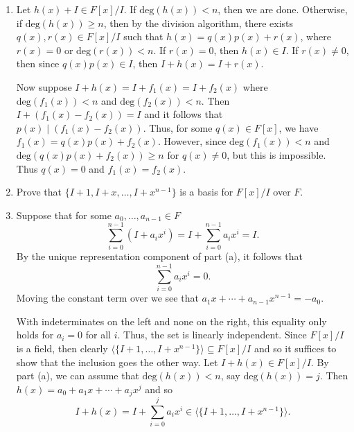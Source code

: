 \documentclass[12pt]{article}
\makeatletter
\theoremstyle{definition}
\theoremstyle{remark}
\renewenvironment{proof}[1][\proofname]{\par
  \pushQED{\qed}%
  \normalfont \topsep6\p@\@plus6\p@\relax
  \list{}{\leftmargin=0mm
          \rightmargin=4mm
          \settowidth{\itemindent}{\itshape#1}%
          \labelwidth=\itemindent
          \parsep=0pt \listparindent=\parindent 
  }
  \item[\hskip\labelsep
        \itshape
    #1\@addpunct{.}]\ignorespaces
}{%
  \popQED\endlist\@endpefalse
}
\let\oldproofname=\proofname
\renewcommand{\proofname}{\bf{\textit{\oldproofname}}}
\makeatother
\begin{document}
\begin{enumerate}[leftmargin=*]
\begin{enumerate}
\begin{proof}
                        Let $h(x)+I\in F[x]/I$. If $\text{deg}(h(x))< n$, then we are done. Otherwise, if $\text{deg}(h(x))\geq n$, then by the division algorithm, there exists $q(x),r(x)\in F[x]/I$ such that $h(x)=q(x)p(x)+r(x)$, where $r(x)=0$ or $\text{deg}(r(x))<n$. If $r(x)=0$, then $h(x)\in I$. If $r(x)\neq 0$, then since $q(x)p(x)\in I$, then $I+h(x)=I+r(x)$.\par\hspace{4mm} Now suppose $I+h(x)=I+f_1(x)=I+f_2(x)$ where $\text{deg}(f_1(x))<n$ and $\text{deg}(f_2(x))<n$. Then $I+(f_1(x)-f_2(x))=I$ and it follows that $p(x)\mid(f_1(x)-f_2(x))$. Thus, for some $q(x)\in F[x]$, we have $f_1(x)=q(x)p(x)+f_2(x)$. However, since $\text{deg}(f_1(x))<n$ and $\text{deg}(q(x)p(x)+f_2(x))\geq n$ for $q(x)\neq 0$, but this is impossible. Thus $q(x)=0$ and $f_1(x)=f_2(x)$. 
                    \end{proof}
                \item Prove that $\{I+1,I+x,\dots,I+x^{n-1}\}$ is a basis for $F[x]/I$ over $F$.
                    \begin{proof}
                        Suppose that for some $a_0,\dots,a_{n-1}\in F$
                            \begin{equation*}
                                \sum_{i=0}^{n-1}(I+a_ix^i)=I+\sum_{i=0}^{n-1}a_ix^i=I.
                            \end{equation*}
                        By the unique representation component of part (a), it follows that 
                            \begin{equation*}
                                \sum_{i=0}^{n-1}a_ix^i=0.
                            \end{equation*}
                        Moving the constant term over we see that $a_1x+\cdots+a_{n-1}x^{n-1}=-a_0$.\par\hspace{4mm}With indeterminates on the left and none on the right, this equality only holds for $a_i=0$ for all $i$. Thus, the set is linearly independent. Since $F[x]/I$ is a field, then clearly $\langle\{I+1,\dots,I+x^{n-1}\}\rangle\subseteq F[x]/I$ and so it suffices to show that the inclusion goes the other way. Let $I+h(x)\in F[x]/I$. By part (a), we can assume that $\text{deg}(h(x))<n$, say $\text{deg}(h(x))=j$. Then $h(x)=a_0+a_1x+\cdots+a_jx^j$ and so 
                            \begin{equation*}
                                I+h(x)=I+\sum_{i=0}^ja_ix^i\in\langle\{I+1,\dots,I+x^{n-1}\}\rangle.

\end{equation*}
\end{proof}
\end{enumerate}
\end{enumerate}
\end{document}
